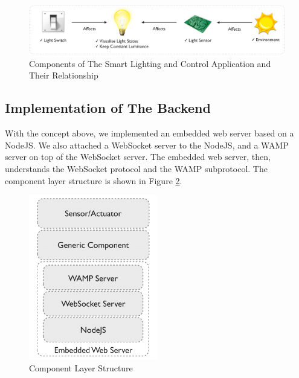 \begin{figure}[ht]
  \begin{center}
    \includegraphics[width=1\textwidth]{images/components-relationship.pdf}
    \caption{Components of The Smart Lighting and Control Application and Their Relationship}
    \label{fig:components-relationship}
  \end{center}
\end{figure}

\subsection{Implementation of The Backend}
With the concept above, we implemented an embedded web server based on a NodeJS. We also attached a WebSocket server to the NodeJS, and a WAMP server on top of the WebSocket server. The embedded web server, then, understands the WebSocket protocol and the WAMP subprotocol. The component layer structure is shown in Figure  \ref{fig:component-layer-structure}. 

\begin{figure}[ht]
  \begin{center}
    \includegraphics[width=0.5\textwidth]{images/component-layer-structure.pdf}
    \caption{Component Layer Structure}
    \label{fig:component-layer-structure}
  \end{center}
\end{figure}

